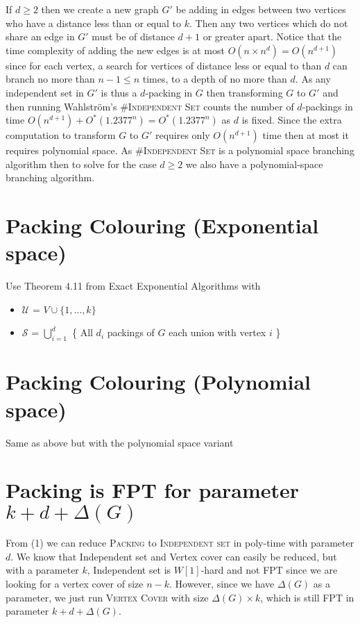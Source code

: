 \documentclass[10pt, a4paper]{article}
\theoremstyle{definition}
\newcommand{\mcS}{\mathcal{S}}
\newcommand{\mcU}{\mathcal{U}}
\begin{document}
If $d \geq 2$ then we create a new graph $G'$ be adding in edges between two vertices who have a distance less than or equal to $k$. Then any two vertices which do not share an edge in $G'$ must be of distance $d+1$ or greater apart. Notice that the time complexity of adding the new edges is at most $O(n \times n^d) = O(n^{d+1})$ since for each vertex, a search for vertices of distance less or equal to than $d$ can branch no more than $n-1 \leq n$ times, to a depth of no more than $d$. As any independent set in $G'$ is thus a $d$-packing in $G$ then transforming $G$ to $G'$ and then running Wahlstr\"{o}m's \#\textsc{Independent Set} counts the number of $d$-packings in time $O(n^{d+1}) + O^*(1.2377^n) = O^*(1.2377^n)$ as $d$ is fixed. Since the extra computation to transform $G$ to $G'$ requires only $O(n^{d+1})$ time then at most it requires polynomial space. As \#\textsc{Independent Set} is a polynomial space branching algorithm then to solve for the case $d \geq 2$ we also have a polynomial-space branching algorithm.

\section{\sc Packing Colouring  (\textnormal{Exponential space})}

Use Theorem 4.11 from Exact Exponential Algorithms with
\begin{itemize}
	\item $\mcU$ = $V \cup \{1,...,k\}$
	\item $\mcS$ = $\bigcup_{i = 1}^d$ \{ 
		All $d_i$ packings of $G$ each union with vertex $i$ \}
\end{itemize}

\section{\sc Packing Colouring (\textnormal{Polynomial space})}

Same as above but with the polynomial space variant

\section{\sc Packing \textnormal{is FPT for parameter $k + d + \Delta (G)$} }

From (1) we can reduce \textsc{Packing} to \textsc{Independent set} in poly-time with parameter $d$. We know that Independent set and Vertex cover can easily be reduced, but with a parameter $k$, Independent set is $W[1]$-hard and not FPT since we are looking for a vertex cover of size $n-k$. However, since we have $\Delta(G)$ as a parameter, we just run \textsc{Vertex Cover} with size $\Delta(G) \times k$, which is still FPT in parameter $k + d + \Delta(G)$.
\end{document}
